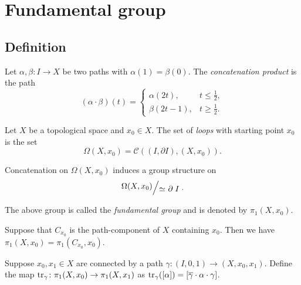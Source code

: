 \section{Fundamental group}

\subsection{Definition}

\begin{definicija}
Let $\alpha, \beta \colon I \to X$ be two paths with
$\alpha(1) = \beta(0)$. The
\emph{concatenation product} is the
path
\[
(\alpha \cdot \beta)(t) =
\begin{cases}
\alpha(2t),    & t \leq \frac{1}{2}, \\
\beta(2t - 1), & t \geq \frac{1}{2}.
\end{cases}
\]
\end{definicija}

\begin{definicija}
Let $X$ be a topological space and $x_0 \in X$. The set of
\emph{loops} with starting point $x_0$ is the set
\[
\Omega(X, x_0) = \mathcal{C}((I, \partial I), (X, x_0)).
\]
\end{definicija}

\begin{izrek}
Concatenation on $\Omega(X, x_0)$ induces a group structure on
\[
\kvoc{\Omega(X, x_0)}{\simeq~\rel \partial I}.
\]
\end{izrek}

\begin{definicija}
The above group is called the
\emph{fundamental group} and is denoted by
$\pi_1(X, x_0)$.
\end{definicija}


\begin{opomba}
Suppose that $C_{x_0}$ is the path-component of $X$ containing
$x_0$. Then we have $\pi_1(X, x_0) = \pi_1(C_{x_0}, x_0)$.
\end{opomba}

\begin{definicija}
Suppose $x_0, x_1 \in X$ are connected by a path
$\gamma \colon (I, 0, 1) \to (X, x_0, x_1)$. Define the map
$\operatorname{tr}_\gamma \colon \pi_1(X, x_0) \to \pi_1(X, x_1)$ as
$\operatorname{tr}_\gamma([\alpha]) =
[\overline{\gamma} \cdot \alpha \cdot \gamma]$.
\end{definicija}

